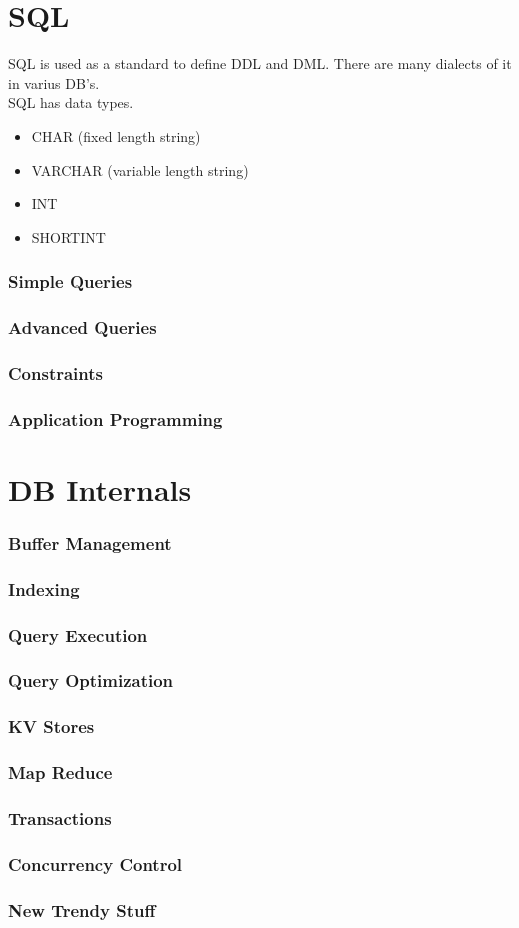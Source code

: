 \documentclass[12pt]{article}
\theoremstyle{definition}
\begin{document}
\part{SQL}
SQL is used as a standard to define DDL and DML. There are many dialects of it in varius DB's.
\\ \linebreak
SQL has data types.
\begin{itemize}
	\item CHAR (fixed length string)
	\item VARCHAR (variable length string)
	\item INT
	\item SHORTINT
\end{itemize}
\section{Simple Queries}
\section{Advanced Queries}
\section{Constraints}
\section{Application Programming}

\part{DB Internals}
\section{Buffer Management}
\section{Indexing}
\section{Query Execution}
\section{Query Optimization}
\section{KV Stores}
\section{Map Reduce}
\section{Transactions}
\section{Concurrency Control}
\section{New Trendy Stuff}
\end{document}

